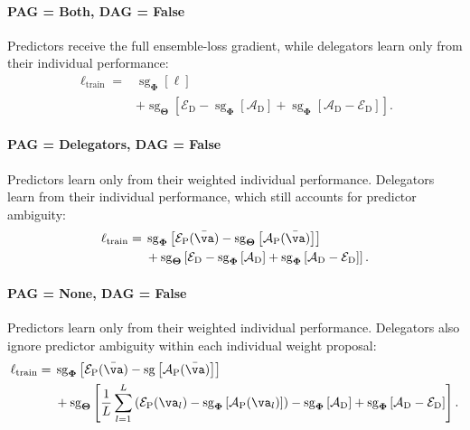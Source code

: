 \documentclass[10pt]{article} %
\def\vTheta{{\bm{\Theta}}}
\def\vPhi{{\bm{\Phi}}}
\newcommand{\dambiguity}{\mathcal{A}_{\mathrm{D}}}
\newcommand{\pambiguity}{\mathcal{A}_{\mathrm{P}}}
\newcommand{\pperformance}{\mathcal{E}_{\mathrm{P}}}
\newcommand{\dperformance}{\mathcal{E}_{\mathrm{D}}}
\newcommand{\sg}{\operatorname{sg}}
\begin{document}
\paragraph{PAG = Both, DAG = False}
Predictors receive the full ensemble-loss gradient, while delegators learn only from their individual performance:
\begin{equation}
\begin{aligned}
    \ell_{\mathrm{train}}
    ={}& \sg_{\vPhi}\left[\ell\right]\\
       &+ \sg_{\vTheta}\left[
           \dperformance
           - \sg_{\vPhi}\left[\dambiguity\right]
           + \sg_{\vPhi}\left[\dambiguity-\dperformance\right]
         \right].
\end{aligned}
\end{equation}

\paragraph{PAG = Delegators, DAG = False}
Predictors learn only from their weighted individual performance. Delegators learn from their individual performance, which still accounts for predictor ambiguity:
\begin{equation}
\begin{aligned}
    \ell_{\mathrm{train}}
    ={}& \sg_{\vPhi}\left[
           \pperformance(\bar{\va})
           - \sg_{\vTheta}\left[\pambiguity(\bar{\va})\right]
         \right]\\
       &+ \sg_{\vTheta}\left[
           \dperformance
           - \sg_{\vPhi}\left[\dambiguity\right]
           + \sg_{\vPhi}\left[\dambiguity-\dperformance\right]
         \right].
\end{aligned}
\end{equation}

\paragraph{PAG = None, DAG = False}
Predictors learn only from their weighted individual performance. Delegators also ignore predictor ambiguity within each individual weight proposal:
\begin{equation}
\begin{aligned}
    \ell_{\mathrm{train}}
    ={}& \sg_{\vPhi}\left[
           \pperformance(\bar{\va})
           - \sg\left[\pambiguity(\bar{\va})\right]
         \right]\\
       &+ \sg_{\vTheta}\left[
           \frac{1}{L}\sum_{l=1}^L
           \left(
               \pperformance(\va_l)
               - \sg_{\vPhi}\left[\pambiguity(\va_l)\right]
           \right)
           - \sg_{\vPhi}\left[\dambiguity\right]
           + \sg_{\vPhi}\left[\dambiguity-\dperformance\right]
         \right].
\end{aligned}
\end{equation}
\end{document}
